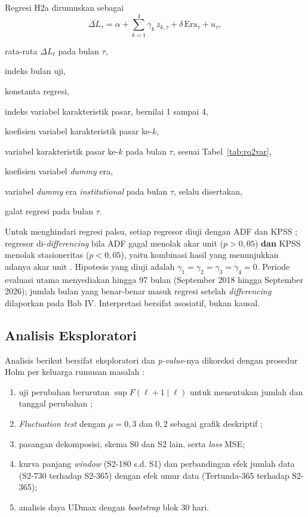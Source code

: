 Regresi H2a dirumuskan sebagai
\begin{equation}
  \overline{\Delta L}_\tau = \alpha + \sum_{k=1}^{4} \gamma_k\, z_{k,\tau}
    + \delta\, \text{Era}_\tau + u_\tau,
  \label{eq:rq2}
\end{equation}
\begin{keterangan}
  \item[$\overline{\Delta L}_\tau$] rata-rata $\Delta L_t$ pada bulan $\tau$,
  \item[$\tau$] indeks bulan uji,
  \item[$\alpha$] konstanta regresi,
  \item[$k$] indeks variabel karakteristik pasar, bernilai 1 sampai 4,
  \item[$\gamma_k$] koefisien variabel karakteristik pasar ke-$k$,
  \item[$z_{k,\tau}$] variabel karakteristik pasar ke-$k$ pada bulan $\tau$,
    sesuai Tabel~\ref{tab:rq2var},
  \item[$\delta$] koefisien variabel \textit{dummy} era,
  \item[$\text{Era}_\tau$] variabel \textit{dummy} era
    \textit{institutional} pada bulan $\tau$, selalu disertakan,
  \item[$u_\tau$] galat regresi pada bulan $\tau$.
\end{keterangan}
Untuk menghindari regresi palsu, setiap regresor diuji
dengan ADF \cite{dickey1979} dan KPSS \cite{kwiatkowski1992}; regresor
di-\textit{differencing} bila ADF gagal menolak akar unit ($p > 0{,}05$)
\textbf{dan} KPSS menolak stasioneritas ($p < 0{,}05$), yaitu kombinasi hasil
yang menunjukkan adanya akar unit \cite{kwiatkowski1992}. Hipotesis yang diuji
adalah $\gamma_1 = \gamma_2 = \gamma_3 = \gamma_4 = 0$. Periode evaluasi utama menyediakan hingga 97 bulan (September 2018 hingga
September 2026); jumlah bulan yang benar-benar masuk regresi setelah
\textit{differencing} dilaporkan pada Bab IV. Interpretasi bersifat
asosiatif, bukan kausal.

\subsection{Analisis Eksploratori}
Analisis berikut bersifat eksploratori dan \textit{p-value}-nya dikoreksi
dengan prosedur Holm per keluarga rumusan masalah \cite{holm1979}:
\begin{enumerate}
  \item uji perubahan berurutan $\sup F(\ell+1 \mid \ell)$ untuk menentukan
        jumlah dan tanggal perubahan \cite{bai2003};
  \item \textit{Fluctuation test} dengan $\mu = 0{,}3$ dan $0{,}2$ sebagai
        grafik deskriptif \cite{giacomini2010};
  \item pasangan dekomposisi, skema S0 dan S2 lain, serta \textit{loss} MSE;
  \item kurva panjang \textit{window} (S2-180 s.d. S1) dan perbandingan efek
        jumlah data (S2-730 terhadap S2-365) dengan efek umur data
        (Tertunda-365 terhadap S2-365);
  \item analisis daya UDmax dengan \textit{bootstrap} blok 30 hari.
\end{enumerate}

